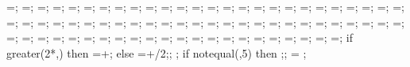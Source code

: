 {{\phortextshifty=\phortextshifty;
\phorsegm=\phorsegm;
\phorsprwid=\phorsprwid;
\phorsprlinethk=\phorsprlinethk;
\phorsuppwidth=\phorsuppwidth;
\phorsuppdepth=\phorsuppdepth;
\phorsupplinethk=\phorsupplinethk;
\pverspringspace=\pverspringspace;
\pvertextshiftx=\pvertextshiftx;
\pvertextshifty=\pvertextshifty;
\pverspringlength=\pverspringlength;
\pverampl=\pverampl;
\pversegm=\pversegm;
\pverspringthk=\pverspringthk;
\pversuppwidth=\pversuppwidth;
\pversuppdepth=\pversuppdepth;
\pversupplinethk=\pversupplinethk;
\pvertextshiftx=\pvertextshiftx;
\pvertextshifty=\pvertextshifty;
\paxialspringlength=\paxialspringlength;
\paxialspringsegm=\paxialspringsegm;
\paxialspringwidth=\paxialspringwidth;
\paxialspringlinethk=\paxialspringlinethk;
\paxialsuppwidth=\paxialsuppwidth;
\paxialsuppdepth=\paxialsuppdepth;
\paxialsupplinethk=\paxialsupplinethk;
\leftwspringspace=\leftwspringspace;
\leftwtextshiftx=\leftwtextshiftx;
\leftwtextshifty=\leftwtextshifty;
\leftwspringlength=\leftwspringlength;
\leftwampl=\leftwampl;
\leftwsegm=\leftwsegm;
\leftwspringthk=\leftwspringthk;
\leftwsuppwidth=\leftwsuppwidth;
\leftwsuppdepth=\leftwsuppdepth;
\leftwsupplinethk=\leftwsupplinethk;
\rightwspringspace=\rightwspringspace;
\rightwtextshiftx=\rightwtextshiftx;
\rightwtextshifty=\rightwtextshifty;
\rightwspringlength=\rightwspringlength;
\rightwampl=\rightwampl;
\rightwsegm=\rightwsegm;
\rightwspringthk=\rightwspringthk;
\rightwsuppwidth=\rightwsuppwidth;
\rightwsuppdepth=\rightwsuppdepth;
\rightwsupplinethk=\rightwsupplinethk;
\foundspringspace=\foundspringspace;
\foundtextshiftx=\foundtextshiftx;
\foundtextshifty=\foundtextshifty;
\foundspringlength=\foundspringlength;
\foundampl=\foundampl;
\foundsegm=\foundsegm;
\foundspringthk=\foundspringthk;
\foundsuppwidth=\foundsuppwidth;
\foundsuppdepth=\foundsuppdepth;
\foundsupplinethk=\foundsupplinethk;
\lefttriw=\lefttriw;
\leftlinew=\leftlinew;
\leftlined=\leftlined;
\leftlinet=\leftlinet;
\leftxvalue=\leftxvalue;
\leftyvalue=\leftyvalue;
\righttriw=\righttriw;
\rightlinew=\rightlinew;
\rightlined=\rightlined;
\rightlinet=\rightlinet;
\rightxvalue=\rightxvalue;
\rightyvalue=\rightyvalue;
\bottomtriw=\bottomtriw;
\bottomlinew=\bottomlinew;
\bottomlined=\bottomlined;
\bottomlinet=\bottomlinet;
\bottomxvalue=\bottomxvalue;
\bottomyvalue=\bottomyvalue;
if greater(2*\massrad,\collinet) then {
\latloadshift=\latloadshift+\massrad;} else {
\latloadshift=\latloadshift+\collinet/2;};
;
%
if notequal(\showsupports,5) then {;};
%
\storyminone = ;
}}
